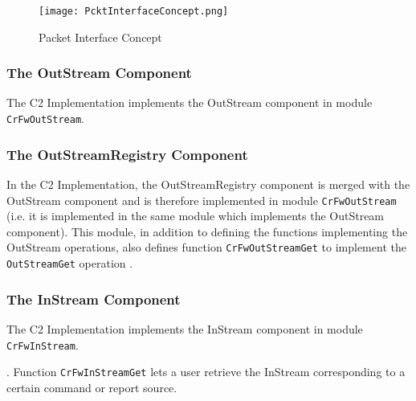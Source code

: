 \documentclass{pnp_article}
\begin{document}
\begin{figure}[ht]
 \centering
 \texttt{[image: PcktInterfaceConcept.png]}
 \caption{Packet Interface Concept}
 \label{fig:PcktInterfaceConcept}
\end{figure}


\subsubsection{The OutStream Component}\label{sec:OutStream}


The C2 Implementation implements the OutStream component in module \texttt{CrFwOutStream}.


\subsubsection{The OutStreamRegistry Component}\label{sec:OutStreamRegistry}


In the C2 Implementation, the OutStreamRegistry component is merged with the OutStream component and is therefore implemented in module \texttt{CrFwOutStream} (i.e. it is implemented in the same module which implements the OutStream component). This module, in addition to defining the functions implementing the OutStream operations, also defines function \texttt{CrFwOutStreamGet} to implement the \texttt{OutStreamGet} operation . 


\subsubsection{The InStream Component}\label{sec:InStream}


The C2 Implementation implements the InStream component in module \texttt{CrFwInStream}. 

. Function \texttt{CrFwInStreamGet} lets a user retrieve the InStream corresponding to a certain command or report source. 
\end{document}
